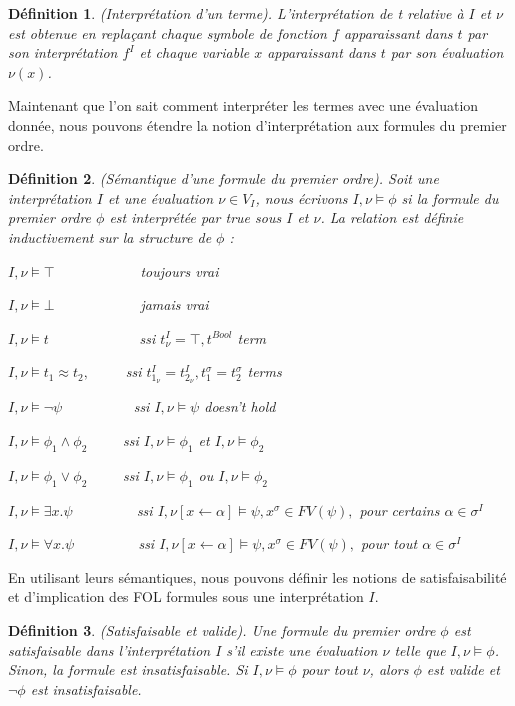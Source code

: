 \documentclass[11pt,openany]{article}
\newtheorem{definition}{D\'efinition}[subsection]
\begin{document}
\begin{definition}
(Interpr\'etation d'un terme). L'interpr\'etation de t relative \`a $I$ et $\nu$ est obtenue en repla\c{c}ant chaque symbole de fonction $f$ apparaissant dans $t$ par son interpr\'etation $f^{I}$ et chaque variable $x$ apparaissant dans $t$ par son \'evaluation $\nu(x)$.
\end{definition}
Maintenant que l'on sait comment interpr\'eter les termes avec une \'evaluation donn\'ee, nous pouvons \'etendre la notion d'interpr\'etation aux formules du premier ordre.
\begin{definition}
(S\'emantique d'une formule du premier ordre). Soit une interpr\'etation $I$ et une \'evaluation $\nu \in V_{I}$, nous \'ecrivons $I,\nu\models\phi$ si la formule du premier ordre $\phi$ est interpr\'et\'ee par true sous $I$ et $\nu$. La relation est d\'efinie inductivement sur la structure de $\phi$ :\par
$I,\nu\models\top$~~~~~~~~~~~~toujours vrai\par
$I,\nu\models\bot$~~~~~~~~~~~~jamais vrai\par
$I,\nu\models t$~~~~~~~~~~~~ ssi $t^{I}_{\nu}=\top,t^{Bool}$ term\par
$I,\nu\models t_{1}\approx t_{2},$~~~~~ssi $t^{I}_{1_{\nu}}=t^{I}_{2_{\nu}},t^{\sigma}_{1}=t^{\sigma}_{2}$ terms\par
$I,\nu\models\neg\psi$~~~~~~~~~~ssi $I,\nu\models\psi$ doesn't hold\par
$I,\nu\models\phi_{1}\land\phi_{2}$~~~~~ssi $I,\nu\models\phi_{1}$ et $I,\nu\models\phi_{2}$\par
$I,\nu\models\phi_{1}\lor\phi_{2}$~~~~~ssi $I,\nu\models\phi_{1}$ ou $I,\nu\models\phi_{2}$\par
$I,\nu\models\exists x.\psi$~~~~~~~~~ssi $I,\nu[x\leftarrow\alpha]\models\psi, x^{\sigma}\in FV(\psi),$ pour certains $\alpha\in\sigma^{I}$\par
$I,\nu\models\forall x.\psi$~~~~~~~~~ssi $I,\nu[x\leftarrow\alpha]\models\psi, x^{\sigma}\in FV(\psi),$ pour tout $\alpha\in\sigma^{I}$
\end{definition}

En utilisant leurs s\'emantiques, nous pouvons d\'efinir les notions de satisfaisabilit\'e  et d'implication des FOL formules sous une interpr\'etation $I$.

\begin{definition}
(Satisfaisable et valide). Une formule du premier ordre $\phi$ est satisfaisable dans l'interpr\'etation $I$ s'il existe une \'evaluation $\nu$ telle que $I,\nu\models\phi$. Sinon, la formule est insatisfaisable. Si $I,\nu\models\phi$ pour tout $\nu$, alors $\phi$ est valide et $\neg\phi$ est insatisfaisable.
\end{definition}
\end{document}
